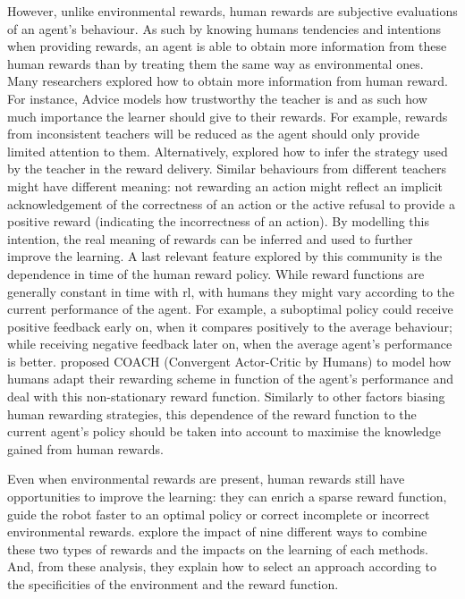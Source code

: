 However, unlike environmental rewards, human rewards are subjective evaluations of an agent's behaviour. As such by knowing humans tendencies and intentions when providing rewards, an agent is able to obtain more information from these human rewards than by treating them the same way as environmental ones. Many researchers explored how to obtain more information from human reward. For instance, Advice \citep{griffith2013policy} models how trustworthy the teacher is and as such how much importance the learner should give to their rewards. For example, rewards from inconsistent teachers will be reduced as the agent should only provide limited attention to them. Alternatively, \cite{loftin2016learning} explored how to infer the strategy used by the teacher in the reward delivery. Similar behaviours from different teachers might have different meaning: not rewarding an action might reflect an implicit acknowledgement of the correctness of an action or the active refusal to provide a positive reward (indicating the incorrectness of an action). By modelling this intention, the real meaning of rewards can be inferred and used to further improve the learning. A last relevant feature explored by this community is the dependence in time of the human reward policy. While reward functions are generally constant in time with \gls{rl}, with humans they might vary according to the current performance of the agent. For example, a suboptimal policy could receive positive feedback early on, when it compares positively to the average behaviour; while receiving negative feedback later on, when the average agent's performance is better. \cite{macglashan2017interactive} proposed COACH (Convergent Actor-Critic by Humans) to model how humans adapt their rewarding scheme in function of the agent's performance and deal with this non-stationary reward function. Similarly to other factors biasing human rewarding strategies, this dependence of the reward function to the current agent's policy should be taken into account to maximise the knowledge gained from human rewards.

Even when environmental rewards are present, human rewards still have opportunities to improve the learning: they can enrich a sparse reward function, guide the robot faster to an optimal policy or correct incomplete or incorrect environmental rewards. \cite{knox2010combining} explore the impact of nine different ways to combine these two types of rewards and the impacts on the learning of each methods. And, from these analysis, they explain how to select an approach according to the specificities of the environment and the reward function.


